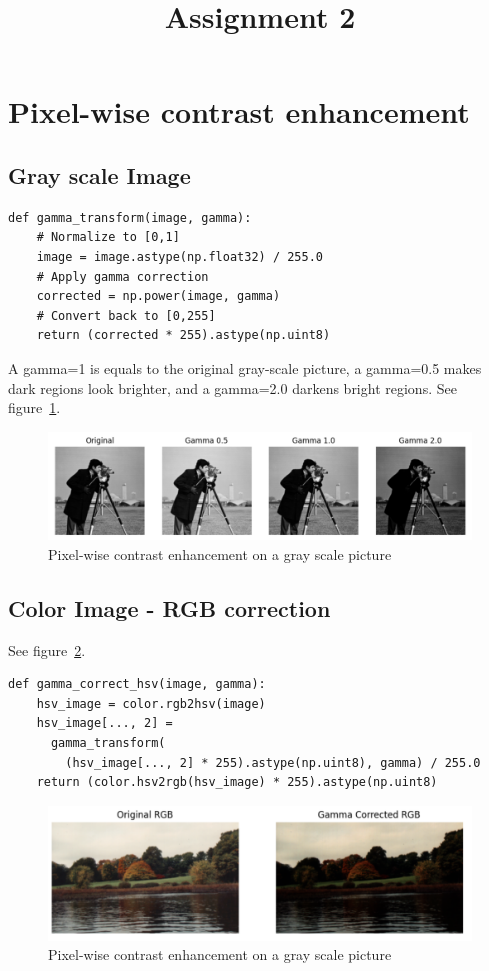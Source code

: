 \documentclass[12pt]{article}
\title{Assignment 2}
\begin{document}
\maketitle

\section{Pixel-wise contrast enhancement}
\subsection{Gray scale Image}
\begin{lstlisting}
def gamma_transform(image, gamma):
    # Normalize to [0,1]
    image = image.astype(np.float32) / 255.0 
    # Apply gamma correction
    corrected = np.power(image, gamma) 
    # Convert back to [0,255]
    return (corrected * 255).astype(np.uint8) 
\end{lstlisting}

A gamma=1 is equals to the original gray-scale picture, a gamma=0.5 makes dark regions look brighter, and a gamma=2.0 darkens bright regions. See figure~\ref{fig:1.1}.

\begin{figure}[ht]
\centering
    \includegraphics[width=0.7\columnwidth, keepaspectratio]{pics/a2-1.1}
\caption[]{Pixel-wise contrast enhancement on a gray scale picture}
\label{fig:1.1}
\end{figure}

\subsection{Color Image - RGB correction}

 See figure~\ref{fig:1.2}.

\begin{lstlisting}
def gamma_correct_hsv(image, gamma):
    hsv_image = color.rgb2hsv(image)
    hsv_image[..., 2] = 
      gamma_transform(
      	(hsv_image[..., 2] * 255).astype(np.uint8), gamma) / 255.0
    return (color.hsv2rgb(hsv_image) * 255).astype(np.uint8)
\end{lstlisting}
\begin{figure}[ht]
\centering
    \includegraphics[width=0.7\columnwidth, keepaspectratio]{pics/a2-1.2}
\caption[]{Pixel-wise contrast enhancement on a gray scale picture}
\label{fig:1.2}
\end{figure}
\end{document}
